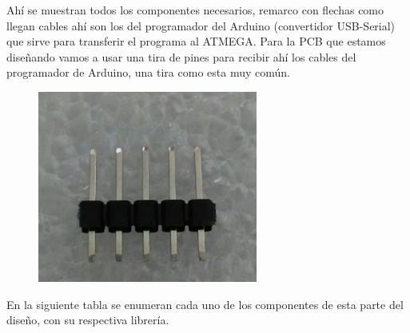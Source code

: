 \documentclass[12pt]{article}
\begin{document}

\par

Ahí se muestran todos los componentes necesarios, remarco con flechas como llegan cables ahí son los del programador del Arduino (convertidor USB-Serial) que sirve para transferir el programa al ATMEGA. Para la PCB que estamos diseñando vamos a usar una tira de pines para recibir ahí los cables del programador de Arduino, una tira como esta muy común.\par




\begin{figure}[H]
	\begin{Center}
		\includegraphics[width=2.84in,height=2.48in]{./media/image17.jpeg}
	\end{Center}
\end{figure}



\par

En la siguiente tabla se enumeran cada uno de los componentes de esta parte del diseño, con su respectiva librería.\par



\end{document}
